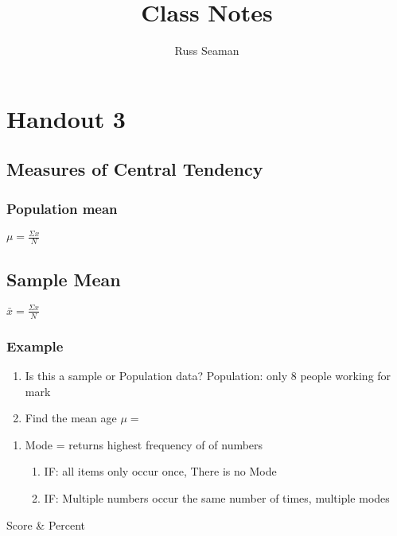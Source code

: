 \documentclass{article}
\title{Class Notes}
\author{Russ Seaman}
\begin{document}
\maketitle
\tableofcontents
\section{Handout 3}
\subsection{Measures of Central Tendency}

\subsubsection{Population mean}
$\mu = \frac{\Sigma x}{N}$
\subsection{Sample Mean}
$\bar{x} =  \frac{\Sigma x}{N} $

\subsubsection{Example}

\begin{enumerate}
  \item Is this a sample or Population data?
    Population: only 8 people working for mark
  \item Find the mean age
  	$\mu = $
\end{enumerate}

\begin{enumerate}
  \item Mode = returns highest frequency of of numbers
  \begin{enumerate}
    \item IF: all items only occur once, There is no Mode
    \item IF: Multiple numbers occur the same number of times, multiple modes
  \end{enumerate}

\end{enumerate}

\begin{tabbing}
	Score & Percent
\end{tabbing}
\end{document}
